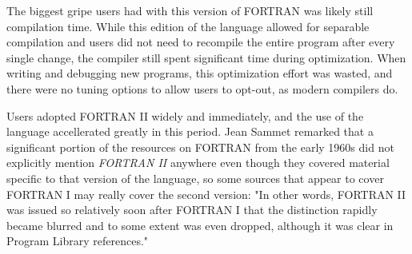 The biggest gripe users had with this version of FORTRAN was
likely still compilation time.
While this edition of the language allowed for separable compilation and users did not need to recompile
the entire program after every single change, the compiler still spent significant time
during optimization.
When writing and debugging new programs, this optimization effort was wasted, and
there were no tuning options to allow users to opt-out, as modern compilers do.

Users adopted FORTRAN II widely and immediately, and the use of the language
accellerated greatly in this period.
Jean Sammet remarked that a significant portion of the resources on FORTRAN
from the early 1960s did not explicitly mention \textit{FORTRAN II} anywhere
even though they covered material specific to that version of the language,
so some sources that appear to cover FORTRAN I may really cover the
second version\cite{sammet_programming_languages_history_and_fundamentals_1969}:
"In other words, FORTRAN II was issued so relatively soon after FORTRAN
I that the distinction rapidly became blurred and to some extent was even
dropped, although it was clear in Program Library references."
